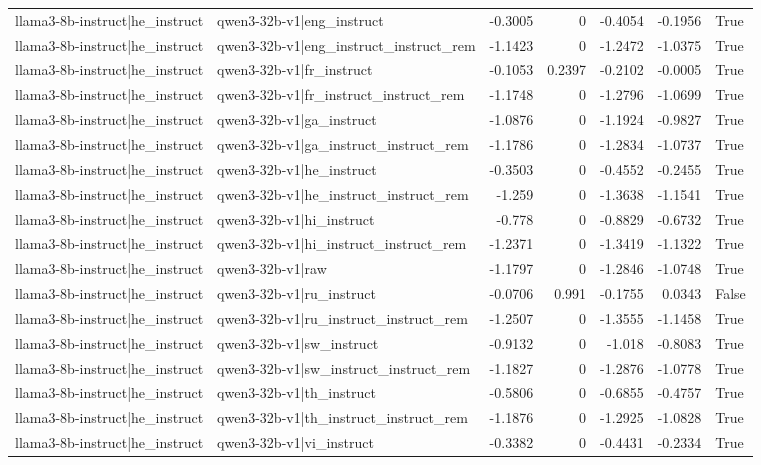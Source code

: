 \begin{table}
\begin{tabular}{l l r r r r l}
llama3-8b-instruct|he_instruct & qwen3-32b-v1|eng_instruct & -0.3005 & 0 & -0.4054 & -0.1956 & True \\
llama3-8b-instruct|he_instruct & qwen3-32b-v1|eng_instruct_instruct_rem & -1.1423 & 0 & -1.2472 & -1.0375 & True \\
llama3-8b-instruct|he_instruct & qwen3-32b-v1|fr_instruct & -0.1053 & 0.2397 & -0.2102 & -0.0005 & True \\
llama3-8b-instruct|he_instruct & qwen3-32b-v1|fr_instruct_instruct_rem & -1.1748 & 0 & -1.2796 & -1.0699 & True \\
llama3-8b-instruct|he_instruct & qwen3-32b-v1|ga_instruct & -1.0876 & 0 & -1.1924 & -0.9827 & True \\
llama3-8b-instruct|he_instruct & qwen3-32b-v1|ga_instruct_instruct_rem & -1.1786 & 0 & -1.2834 & -1.0737 & True \\
llama3-8b-instruct|he_instruct & qwen3-32b-v1|he_instruct & -0.3503 & 0 & -0.4552 & -0.2455 & True \\
llama3-8b-instruct|he_instruct & qwen3-32b-v1|he_instruct_instruct_rem & -1.259 & 0 & -1.3638 & -1.1541 & True \\
llama3-8b-instruct|he_instruct & qwen3-32b-v1|hi_instruct & -0.778 & 0 & -0.8829 & -0.6732 & True \\
llama3-8b-instruct|he_instruct & qwen3-32b-v1|hi_instruct_instruct_rem & -1.2371 & 0 & -1.3419 & -1.1322 & True \\
llama3-8b-instruct|he_instruct & qwen3-32b-v1|raw & -1.1797 & 0 & -1.2846 & -1.0748 & True \\
llama3-8b-instruct|he_instruct & qwen3-32b-v1|ru_instruct & -0.0706 & 0.991 & -0.1755 & 0.0343 & False \\
llama3-8b-instruct|he_instruct & qwen3-32b-v1|ru_instruct_instruct_rem & -1.2507 & 0 & -1.3555 & -1.1458 & True \\
llama3-8b-instruct|he_instruct & qwen3-32b-v1|sw_instruct & -0.9132 & 0 & -1.018 & -0.8083 & True \\
llama3-8b-instruct|he_instruct & qwen3-32b-v1|sw_instruct_instruct_rem & -1.1827 & 0 & -1.2876 & -1.0778 & True \\
llama3-8b-instruct|he_instruct & qwen3-32b-v1|th_instruct & -0.5806 & 0 & -0.6855 & -0.4757 & True \\
llama3-8b-instruct|he_instruct & qwen3-32b-v1|th_instruct_instruct_rem & -1.1876 & 0 & -1.2925 & -1.0828 & True \\
llama3-8b-instruct|he_instruct & qwen3-32b-v1|vi_instruct & -0.3382 & 0 & -0.4431 & -0.2334 & True \\

\end{tabular}
\end{table}

